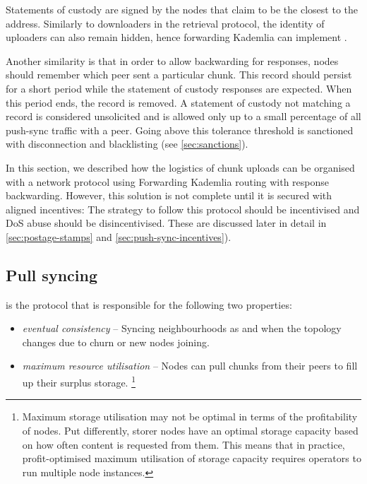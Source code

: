 Statements of custody are signed by the nodes that claim to be the closest to the address. 
Similarly to downloaders in the retrieval protocol, the identity of uploaders can also remain hidden, hence forwarding Kademlia can implement .

Another similarity is that in order to allow backwarding for responses, nodes should remember which peer sent a particular chunk. This record should persist for a short period while the statement of custody responses are expected. When this period ends, the record is removed. A statement of custody not matching a record is considered unsolicited and is allowed only up to a small percentage of all push-sync traffic with a peer. Going above this tolerance threshold is sanctioned with disconnection and blacklisting (see \ref{sec:sanctions}).

In this section, we described how the logistics of chunk uploads can be organised with a network protocol using Forwarding Kademlia routing with response backwarding. However, this solution is not complete until it is secured with aligned incentives: The strategy to follow this protocol should be incentivised and DoS abuse should be disincentivised. These are discussed later in detail in \ref{sec:postage-stamps} and \ref{sec:push-sync-incentives}).

\subsection{Pull syncing\statusgreen}\label{sec:pull-syncing}

 is the protocol that is responsible for the following two properties: 

\begin{itemize}
    \item \emph{eventual consistency} -- Syncing neighbourhoods as and when the topology changes due to churn or new nodes joining.
    \item \emph{maximum resource utilisation} -- Nodes can pull chunks from their peers to fill up their surplus storage.%
%
\footnote{Maximum storage utilisation may not be optimal in terms of the profitability of nodes. Put differently, storer nodes have an optimal storage capacity based on how often content is requested from them. This means that in practice, profit-optimised maximum utilisation of storage capacity requires operators to run multiple node instances.}
\end{itemize}

